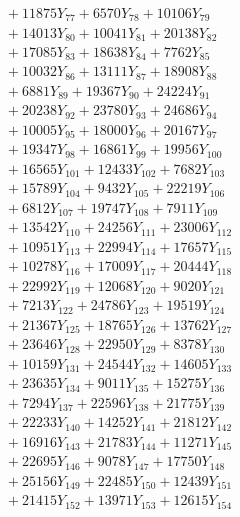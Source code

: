 \documentclass[a4paper,10pt]{article}
\begin{document}
{\begin{align}
&\;  + 11875 Y_{77} + 6570 Y_{78} + 10106 Y_{79} \\[0.3ex]
&\;  + 14013 Y_{80} + 10041 Y_{81} + 20138 Y_{82} \\[0.3ex]
&\;  + 17085 Y_{83} + 18638 Y_{84} + 7762 Y_{85} \\[0.3ex]
&\;  + 10032 Y_{86} + 13111 Y_{87} + 18908 Y_{88} \\[0.5ex]\allowbreak
&\;  + 6881 Y_{89} + 19367 Y_{90} + 24224 Y_{91} \\[0.3ex]
&\;  + 20238 Y_{92} + 23780 Y_{93} + 24686 Y_{94} \\[0.3ex]
&\;  + 10005 Y_{95} + 18000 Y_{96} + 20167 Y_{97} \\[0.3ex]
&\;  + 19347 Y_{98} + 16861 Y_{99} + 19956 Y_{100} \\[0.3ex]
&\;  + 16565 Y_{101} + 12433 Y_{102} + 7682 Y_{103} \\[0.3ex]
&\;  + 15789 Y_{104} + 9432 Y_{105} + 22219 Y_{106} \\[0.3ex]
&\;  + 6812 Y_{107} + 19747 Y_{108} + 7911 Y_{109} \\[0.3ex]
&\;  + 13542 Y_{110} + 24256 Y_{111} + 23006 Y_{112} \\[0.3ex]
&\;  + 10951 Y_{113} + 22994 Y_{114} + 17657 Y_{115} \\[0.3ex]
&\;  + 10278 Y_{116} + 17009 Y_{117} + 20444 Y_{118} \\[0.5ex]\allowbreak
&\;  + 22992 Y_{119} + 12068 Y_{120} + 9020 Y_{121} \\[0.3ex]
&\;  + 7213 Y_{122} + 24786 Y_{123} + 19519 Y_{124} \\[0.3ex]
&\;  + 21367 Y_{125} + 18765 Y_{126} + 13762 Y_{127} \\[0.3ex]
&\;  + 23646 Y_{128} + 22950 Y_{129} + 8378 Y_{130} \\[0.3ex]
&\;  + 10159 Y_{131} + 24544 Y_{132} + 14605 Y_{133} \\[0.3ex]
&\;  + 23635 Y_{134} + 9011 Y_{135} + 15275 Y_{136} \\[0.3ex]
&\;  + 7294 Y_{137} + 22596 Y_{138} + 21775 Y_{139} \\[0.3ex]
&\;  + 22233 Y_{140} + 14252 Y_{141} + 21812 Y_{142} \\[0.3ex]
&\;  + 16916 Y_{143} + 21783 Y_{144} + 11271 Y_{145} \\[0.3ex]
&\;  + 22695 Y_{146} + 9078 Y_{147} + 17750 Y_{148} \\[0.5ex]\allowbreak
&\;  + 25156 Y_{149} + 22485 Y_{150} + 12439 Y_{151} \\[0.3ex]
&\;  + 21415 Y_{152} + 13971 Y_{153} + 12615 Y_{154} \\[0.3ex]

\end{align}}
\end{document}
